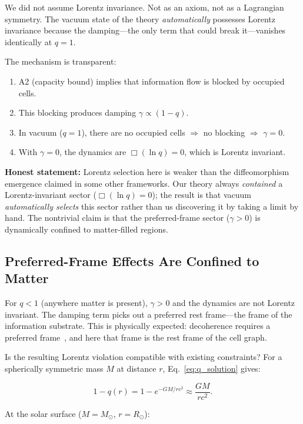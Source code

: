 \documentclass[aps,prd,twocolumn,showpacs,superscriptaddress,preprintnumbers]{revtex4-2}
\begin{document}
We did not assume Lorentz invariance.
Not as an axiom, not as a Lagrangian symmetry.
The vacuum state of the theory \emph{automatically} possesses Lorentz invariance because the damping---the only term that could break it---vanishes identically at $q=1$.

The mechanism is transparent:
\begin{enumerate}
    \item A2 (capacity bound) implies that information flow is blocked by occupied cells.
    \item This blocking produces damping $\gamma\propto(1-q)$.
    \item In vacuum ($q=1$), there are no occupied cells $\Rightarrow$ no blocking $\Rightarrow$ $\gamma=0$.
    \item With $\gamma=0$, the dynamics are $\Box(\ln q)=0$, which is Lorentz invariant.
\end{enumerate}

\textbf{Honest statement:} Lorentz selection here is weaker than the diffeomorphism emergence claimed in some other frameworks.
Our theory always \emph{contained} a Lorentz-invariant sector ($\Box(\ln q)=0$); the result is that vacuum \emph{automatically selects} this sector rather than us discovering it by taking a limit by hand.
The nontrivial claim is that the preferred-frame sector ($\gamma>0$) is dynamically confined to matter-filled regions.

\subsection{Preferred-Frame Effects Are Confined to Matter}

For $q<1$ (anywhere matter is present), $\gamma>0$ and the dynamics are not Lorentz invariant.
The damping term picks out a preferred rest frame---the frame of the information substrate.
This is physically expected: decoherence requires a preferred frame~\cite{Bassi:2013mta}, and here that frame is the rest frame of the cell graph.

Is the resulting Lorentz violation compatible with existing constraints?
For a spherically symmetric mass $M$ at distance $r$, Eq.~\eqref{eq:q_solution} gives:

\begin{equation}
1 - q(r) = 1 - e^{-GM/rc^2} \approx \frac{GM}{rc^2}.
\label{eq:lv_estimate}
\end{equation}

At the solar surface ($M=M_\odot$, $r=R_\odot$):
\end{document}
